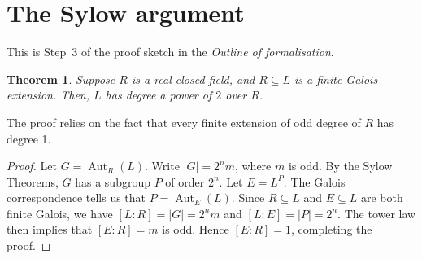 \documentclass{article}
\newtheorem{theorem}{Theorem}
\DeclareMathOperator{\Aut}{Aut}
\begin{document}
\section*{The Sylow argument}
This is Step~3 of the proof sketch in the \emph{Outline of formalisation}.
\begin{theorem}\label{thm:the-sylow-argument}
Suppose $R$ is a real closed field, and $R\subseteq L$ is a finite Galois extension. Then, $L$ has degree a power of $2$ over $R$.
\end{theorem}
The proof relies on the fact that every finite extension of odd degree of $R$
has degree 1.
\begin{proof}
Let $G=\Aut_R(L)$. Write $|G|=2^nm$, where $m$ is odd. By the Sylow Theorems,
$G$ has a subgroup $P$ of order $2^n$. Let $E=L^P$. The Galois correspondence
tells us that $P=\Aut_E(L)$. Since $R\subseteq L$ and $E\subseteq L$ are both
finite Galois, we have $[L:R]=|G|=2^nm$ and $[L:E]=|P|=2^n$. The tower law then
implies that $[E:R]=m$ is odd. Hence $[E:R]=1$, completing the proof.
\end{proof}
\end{document}
